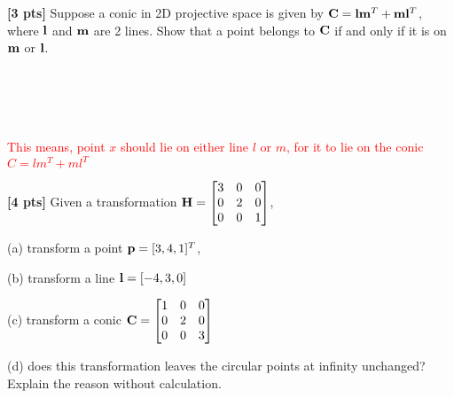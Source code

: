 \documentclass[11pt,addpoints,answers]{exam}
\numberwithin{equation}{section} %
\numberwithin{figure}{section} %
\numberwithin{table}{section} %
\begin{document}
\begin{questions}
\question \textbf{[3 pts]} Suppose a conic in 2D projective space is given by $\mathbf{C} = \mathbf{l}\mathbf{m}^T + \mathbf{m}\mathbf{l}^T$, where $\mathbf{l}$ and $\mathbf{m}$ are 2 lines. Show that a point belongs to $\mathbf{C}$ if and only if it is on $\mathbf{m}$ or $\mathbf{l}$.

\begin{tcolorbox}[fit,height=3cm, width=\textwidth, blank, borderline={0.5pt}{-2pt},halign=left, valign=center, nobeforeafter]

\\
\\
\\
\\
\textcolor{red}{This means, point $x$ should lie on either line $l$ or $m$, for it to lie on the conic $C=lm^T + ml^T$}

\end{tcolorbox}

\question \textbf{[4 pts]} Given a transformation $\mathbf{H} = \begin{bmatrix}
                 3 & 0 & 0  \\
                 0 & 2 & 0  \\
                 0 & 0 & 1  \\
                \end{bmatrix}$,

(a) transform a point $\mathbf{p} = [3,4,1]^T$,

(b) transform a line $\mathbf{l} = [-4, 3, 0]$

(c) transform a conic $\mathbf{C} = \begin{bmatrix}
                 1 & 0 & 0  \\
                 0 & 2 & 0  \\
                 0 & 0 & 3  \\
                \end{bmatrix}$

(d) does this transformation leaves the circular points at infinity unchanged? Explain the reason without calculation.

\begin{tcolorbox}[fit,height=7cm, width=\textwidth, blank, borderline={0.5pt}{-2pt},halign=left, valign=center, nobeforeafter]


\end{tcolorbox}
\end{questions}
\end{document}
